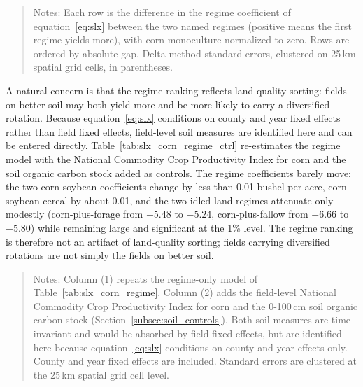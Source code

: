 \documentclass[12pt,letterpaper]{article}
\theoremstyle{remark}
\theoremstyle{remark}
\let\oldtable\table
\let\endoldtable\endtable
\renewenvironment{table}[1][H]{\oldtable[H]}{\endoldtable}
\theoremstyle{plain}
\theoremstyle{definition}
\begin{document}
\begin{table}[H]
  \centering
  \caption{Pairwise yield gaps between rotation regimes.}
  \label{tab:slx_corn_regime_gaps}
  
\end{table}
\begin{quote}
\small
Notes: Each row is the difference in the regime coefficient of equation~\eqref{eq:slx} between the two named regimes (positive means the first regime yields more), with corn monoculture normalized to zero. Rows are ordered by absolute gap. Delta-method standard errors, clustered on 25\,km spatial grid cells, in parentheses.
\end{quote}

A natural concern is that the regime ranking reflects land-quality sorting: fields on better soil may both yield more and be more likely to carry a diversified rotation. Because equation~\eqref{eq:slx} conditions on county and year fixed effects rather than field fixed effects, field-level soil measures are identified here and can be entered directly. Table~\ref{tab:slx_corn_regime_ctrl} re-estimates the regime model with the National Commodity Crop Productivity Index for corn and the soil organic carbon stock added as controls. The regime coefficients barely move: the two corn-soybean coefficients change by less than 0.01 bushel per acre, corn-soybean-cereal by about 0.01, and the two idled-land regimes attenuate only modestly (corn-plus-forage from $-5.48$ to $-5.24$, corn-plus-fallow from $-6.66$ to $-5.80$) while remaining large and significant at the 1\% level. The regime ranking is therefore not an artifact of land-quality sorting; fields carrying diversified rotations are not simply the fields on better soil.

\begin{table}[H]
  \centering
  \caption{Regime model with and without land-quality controls.}
  \label{tab:slx_corn_regime_ctrl}
  
\end{table}
\begin{quote}
\small
Notes: Column (1) repeats the regime-only model of
Table~\ref{tab:slx_corn_regime}. Column (2) adds the field-level National
Commodity Crop Productivity Index for corn and the 0-100\,cm soil organic carbon
stock (Section~\ref{subsec:soil_controls}). Both soil measures are time-invariant
and would be absorbed by field fixed effects, but are identified here because
equation~\eqref{eq:slx} conditions on county and year effects only. County and year fixed effects are
included. Standard errors are clustered at the 25\,km spatial grid cell level.
\end{quote}
\end{document}
